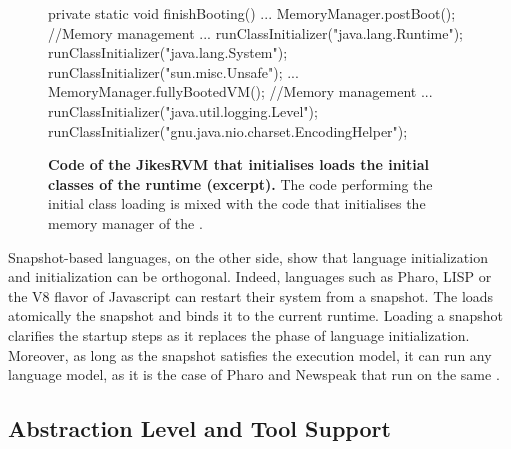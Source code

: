 \begin{figure}[ht]
\begin{code}
private static void finishBooting() {
    ...
    MemoryManager.postBoot(); //Memory management
    ...
    runClassInitializer("java.lang.Runtime");
    runClassInitializer("java.lang.System");
    runClassInitializer("sun.misc.Unsafe");
    ...
    MemoryManager.fullyBootedVM(); //Memory management
    ...
    runClassInitializer("java.util.logging.Level");
    runClassInitializer("gnu.java.nio.charset.EncodingHelper");
}
\end{code}
\caption{\textbf{Code of the JikesRVM that initialises loads the initial classes of the runtime (excerpt).} The code performing the initial class loading is mixed with the code that initialises the memory manager of the \VM.\label{code:jikes_vm_initialization}}
\end{figure}

Snapshot-based languages, on the other side, show that language initialization and \VM initialization can be orthogonal. Indeed, languages such as Pharo, LISP or the V8 flavor of Javascript can restart their system from a snapshot. The \VM loads atomically the snapshot and binds it to the current runtime. Loading a snapshot clarifies the \VM startup steps as it replaces the phase of language initialization. Moreover, as long as the snapshot satisfies the \VM execution model, it can run any language model, as it is the case of Pharo and Newspeak that run on the same \VM.



\subsection{Abstraction Level and Tool Support}

